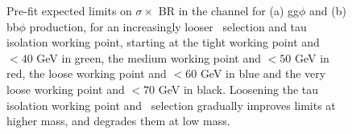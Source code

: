 \begin{figure}[h!]
\begin{center}
\end{center}
\caption{Pre-fit expected limits on $\sigma \times$ BR in the \etau channel for (a) gg$\phi$ and
(b) bb$\phi$ production, for an increasingly looser \mT~selection and tau isolation working point, starting
at the tight working point and \mT$<40$ GeV in green, the medium working point and \mT$<50$ GeV in red,
the loose working point and \mT$<60$ GeV in blue and the very loose working point and \mT$<70$ GeV in black. Loosening
the tau isolation working point and \mT~selection gradually improves limits at higher mass, and
degrades them at low mass.}
\label{fig:mssm_gradcuts_et}
\end{figure}
